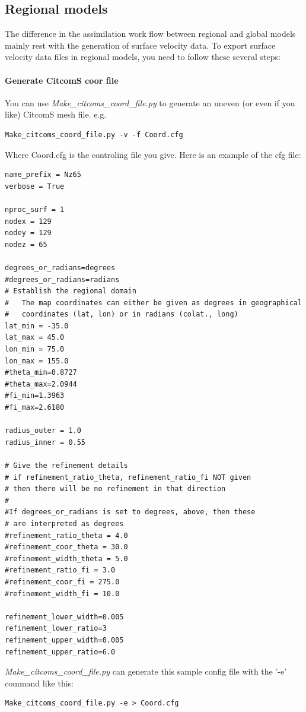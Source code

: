 \documentclass[letterpaper,12pt]{article}
\begin{document}
\subsection{Regional models}
The difference in the assimilation work flow between regional and global models mainly rest with the generation of surface velocity data. To export surface velocity data files in regional models, you need to follow these several steps:

\paragraph{Generate CitcomS coor file}
You can use \textit{Make\_citcoms\_coord\_file.py} to generate an uneven (or even if you like) CitcomS mesh file. e.g. 
\begin{verbatim}
Make_citcoms_coord_file.py -v -f Coord.cfg
\end{verbatim}
Where Coord.cfg is the controling file you give. Here is an example of the cfg file:
\begin{verbatim}
name_prefix = Nz65
verbose = True

nproc_surf = 1
nodex = 129
nodey = 129
nodez = 65

degrees_or_radians=degrees
#degrees_or_radians=radians
# Establish the regional domain
#   The map coordinates can either be given as degrees in geographical
#   coordinates (lat, lon) or in radians (colat., long)
lat_min = -35.0
lat_max = 45.0
lon_min = 75.0
lon_max = 155.0
#theta_min=0.8727
#theta_max=2.0944
#fi_min=1.3963
#fi_max=2.6180

radius_outer = 1.0
radius_inner = 0.55

# Give the refinement details
# if refinement_ratio_theta, refinement_ratio_fi NOT given
# then there will be no refinement in that direction
#
#If degrees_or_radians is set to degrees, above, then these
# are interpreted as degrees
#refinement_ratio_theta = 4.0
#refinement_coor_theta = 30.0
#refinement_width_theta = 5.0
#refinement_ratio_fi = 3.0
#refinement_coor_fi = 275.0
#refinement_width_fi = 10.0

refinement_lower_width=0.005
refinement_lower_ratio=3
refinement_upper_width=0.005
refinement_upper_ratio=6.0
\end{verbatim}

\textit{Make\_citcoms\_coord\_file.py} can generate this sample config file with the '-e' command like this:

\begin{verbatim}
Make_citcoms_coord_file.py -e > Coord.cfg
\end{verbatim}
\end{document}
